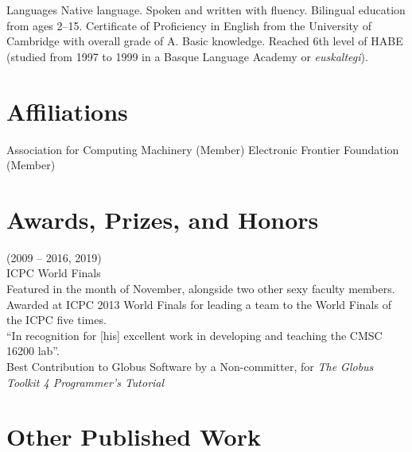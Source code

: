 \documentclass{resume}
\begin{document}
\begin{category}{Languages}
 Native language.
 Spoken and written with fluency. Bilingual education from ages 2--15. Certificate of
Proficiency in English from the University of Cambridge with overall grade of A.
 Basic knowledge. Reached 6th level of HABE (studied from 1997 to 1999 in a Basque Language Academy or \emph{euskaltegi}).
\end{category}

\section*{\hspace{-1cm}Affiliations}

\begin{category}{}
\citembullet Association for Computing Machinery (Member)
\citembullet Electronic Frontier Foundation (Member)
\end{category}

\section*{\hspace{-1cm}Awards, Prizes, and Honors}

\begin{category}{}
 (2009 -- 2016, 2019)\\
ICPC World Finals
\\Featured in the month of November, alongside two other sexy faculty members.
\\Awarded at ICPC 2013 World Finals for leading a team to the World Finals of the ICPC five times.
\\``In recognition for [his] excellent work in developing and teaching the CMSC 16200 lab''.
\\Best Contribution to Globus Software by a Non-committer, for \emph{The Globus Toolkit 4 Programmer's Tutorial}
\end{category}

\section*{\hspace{-1cm}Other Published Work}
\end{document}
